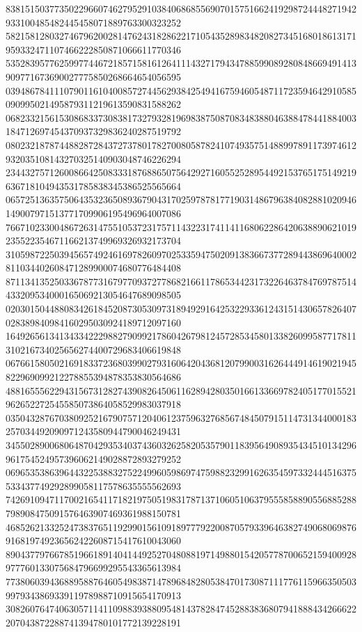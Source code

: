 \begin{DoxyCode}
      838151503773502296607462795291038406868556907015751662419298724448271942933100485482445458071889763300323252
      582158128032746796200281476243182862217105435289834820827345168018613171959332471107466222850871066611770346
      535283957762599774467218571581612641114327179434788599089280848669491413909771673690027775850268664654056595
      039486784111079011610400857274456293842549416759460548711723594642910585090995021495879311219613590831588262
      068233215615308683373083817327932819698387508708348388046388478441884003184712697454370937329836240287519792
      080232187874488287284372737801782700805878241074935751488997891173974612932035108143270325140903048746226294
      234432757126008664250833318768865075642927160552528954492153765175149219636718104943531785838345386525565664
      065725136357506435323650893679043170259787817719031486796384082881020946149007971513771709906195496964007086
      766710233004867263147551053723175711432231741141168062286420638890621019235522354671166213749969326932173704
      310598722503945657492461697826097025335947502091383667377289443869640002811034402608471289900074680776484408
      871134135250336787731679770937277868216611786534423173226463784769787514433209534000165069213054647689098505
      020301504488083426184520873053097318949291642532293361243151430657826407028389840984160295030924189712097160
      164926561341343342229882790992178604267981245728534580133826099587717811310216734025656274400729683406619848
      067661580502169183372368039902793160642043681207990031626444914619021945822969099212278855394878353830564686
      488165556229431567312827439082645061162894280350166133669782405177015521962652272545585073864058529983037918
      035043287670380925216790757120406123759632768567484507915114731344000183257034492090971243580944790046249431
      345502890068064870429353403743603262582053579011839564908935434510134296961754524957396062149028872893279252
      069653538639644322538832752249960598697475988232991626354597332444516375533437749292899058117578635555562693
      742691094711700216541171821975051983178713710605106379555858890556885288798908475091576463907469361988150781
      468526213325247383765119299015610918977792200870579339646382749068069876916819749236562422608715417610043060
      890437797667851966189140414492527048088197149880154205778700652159400928977760133075684796699295543365613984
      773806039436889588764605498387147896848280538470173087111776115966350503997934386933911978988710915654170913
      308260764740630571141109883938809548143782847452883836807941888434266622207043872288741394780101772139228191

\end{DoxyCode}
